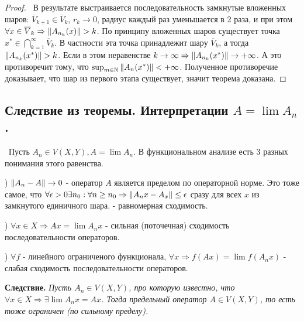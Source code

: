 \begin{proof}
\smallskip
\noindent\textbullet~В результате выстраивается последовательность замкнутые вложенных шаров: $\overline{V}_{k+1} \in \overline{V}_k$, $r_k \to 0$, радиус каждый раз 
уменьшается в 2 раза, и при этом $\forall x \in \overline{V}_k \Rightarrow \left\lVert A_{n_k}(x)\right\rVert > k$. По принципу вложенных шаров существует точка $x^* \in \bigcap_{k = 1}^\infty \overline{V}_k$. В частности эта точка принадлежит шару $\overline{V}_k$, а тогда $\left\lVert A_{n_k}(x^*)\right\rVert > k$. Если в этом неравенстве $k \to \infty \Rightarrow
\left\lVert A_{n_k}(x^*)\right\rVert \to +\infty$. А это противоречит тому, что $\sup_{m \in \mathbb{N}}\left\lVert A_n(x^*)\right\rVert < +\infty$. Полученное противоречие доказывает, что шар из первого 
этапа существует, значит теорема доказана.
\end{proof}


\subsection*{Следствие из теоремы. Интерпретации $A  = \lim A_n$.}

\noindent\textbullet~Пусть $A_n \in V(X, Y), A = \lim A_n$. В функциональном анализе есть 3 разных понимания этого равенства.

) $\left\lVert A_n - A\right\rVert \to 0$ - оператор $A$ является пределом по операторной норме. Это тоже самое, что $\forall \epsilon > 0 \exists n_0 : \forall n \ge n_0 \Rightarrow
\left\lVert A_n x - A_x\right\rVert \le \epsilon$ сразу для всех $x$ из замкнутого единичного шара. - равномерная сходимость.

) $\forall x \in X \Rightarrow A x = \lim A_n x$ - сильная (поточечная) сходимость последовательности операторов.

) $\forall f$ - линейного ограниченого функционала, $\forall x \Rightarrow f(A x) = \lim f(A_n x)$ - слабая сходимость последовательности операторов.

\bigskip\noindent\textbf{Следствие.}\textit{ Пусть $A_n \in V(X, Y)$, про которую известно, что $\forall x \in X \Rightarrow \exists \lim A_n x = A x$. Тогда предельный 
оператор $A \in V(X, Y)$, то есть тоже ограничен (по сильному пределу). }

